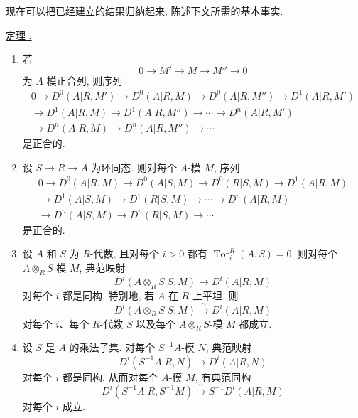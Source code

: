 现在可以把已经建立的结果归纳起来, 陈述下文所需的基本事实.



\underline{定理 .}

\begin{enumerate}[label=(\arabic*)]
\item 若
\[
 0\longrightarrow M'\longrightarrow M\longrightarrow M''
 \longrightarrow0
\]
为 $A$-模正合列, 则序列
\begin{multline*}
0\longrightarrow D^0(A|R,M')\longrightarrow D^0(A|R,M)
\longrightarrow D^0(A|R,M'')\longrightarrow D^1(A|R,M')\\
\longrightarrow D^1(A|R,M)\longrightarrow D^1(A|R,M'')
\longrightarrow\cdots\longrightarrow D^n(A|R,M')\\
\longrightarrow D^n(A|R,M)\longrightarrow D^n(A|R,M'')
\longrightarrow\cdots
\end{multline*}
是正合的.

\item 设 $S\longrightarrow R\longrightarrow A$ 为环同态. 则对每个 $A$-模 $M$, 序列
\begin{multline*}
0\longrightarrow D^0(A|R,M)\longrightarrow D^0(A|S,M)
\longrightarrow D^0(R|S,M)\longrightarrow D^1(A|R,M)\\
\longrightarrow D^1(A|S,M)\longrightarrow D^1(R|S,M)
\longrightarrow\cdots\longrightarrow D^n(A|R,M)\\
\longrightarrow D^n(A|S,M)\longrightarrow D^n(R|S,M)
\longrightarrow\cdots
\end{multline*}
是正合的.

\item 设 $A$ 和 $S$ 为 $R$-代数, 且对每个 $i>0$ 都有 $\operatorname{Tor}_i^R(A,S)=0$. 则对每个 $A\otimes_RS$-模 $M$, 典范映射
\[
 D^i(A\otimes_RS|S,M)\longrightarrow D^i(A|R,M)
\]
对每个 $i$ 都是同构. 特别地, 若 $A$ 在 $R$ 上平坦, 则
\[
 D^i(A\otimes_RS|S,M)\xrightarrow{\ \sim\ }D^i(A|R,M)
\]
对每个 $i$、每个 $R$-代数 $S$ 以及每个 $A\otimes_RS$-模 $M$ 都成立.

\item 设 $S$ 是 $A$ 的乘法子集. 对每个 $S^{-1}A$-模 $N$, 典范映射
\[
 D^i(S^{-1}A|R,N)\longrightarrow D^i(A|R,N)
\]
对每个 $i$ 都是同构. 从而对每个 $A$-模 $M$, 有典范同构
\[
 D^i(S^{-1}A|R,S^{-1}M)
 \xrightarrow{\ \sim\ }S^{-1}D^i(A|R,M)
\]
对每个 $i$ 成立.


\end{enumerate}

